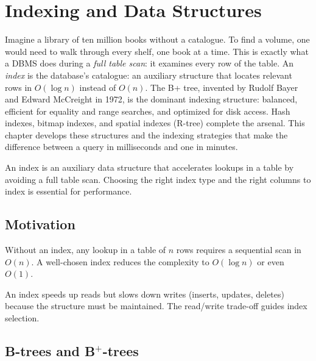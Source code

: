 \chapter{Indexing and Data Structures}
\label{ch:indexing}

Imagine a library of ten million books without a catalogue. To find a volume, one would need to walk through every shelf, one book at a time. This is exactly what a DBMS does during a \emph{full table scan}: it examines every row of the table. An \emph{index} is the database's catalogue: an auxiliary structure that locates relevant rows in $O(\log n)$ instead of $O(n)$. The B+ tree, invented by Rudolf Bayer and Edward McCreight in 1972, is the dominant indexing structure: balanced, efficient for equality and range searches, and optimized for disk access. Hash indexes, bitmap indexes, and spatial indexes (R-tree) complete the arsenal. This chapter develops these structures and the indexing strategies that make the difference between a query in milliseconds and one in minutes.

\begin{intuition}[title=\textbf{Central idea}]
An index is an auxiliary data structure that accelerates lookups in a table
by avoiding a full table scan. Choosing the right index type and the right
columns to index is essential for performance.
\end{intuition}

\section{Motivation}

Without an index, any lookup in a table of $n$ rows requires a sequential
scan in $O(n)$. A well-chosen index reduces the complexity to
$O(\log n)$ or even $O(1)$.

\begin{remark}
An index speeds up reads but slows down writes (inserts, updates, deletes)
because the structure must be maintained. The read/write trade-off guides
index selection.
\end{remark}

\section{B-trees and B$^+$-trees}

